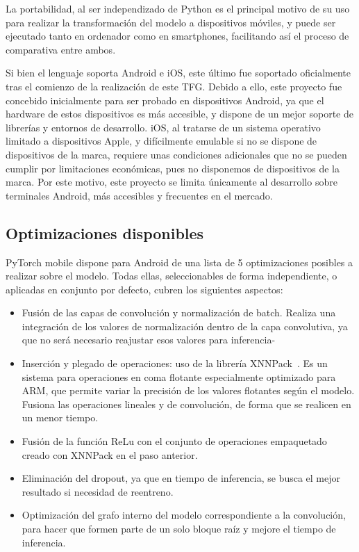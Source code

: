 La portabilidad, al ser independizado de Python es el principal motivo de su uso para realizar la transformación del modelo a dispositivos móviles, y puede ser ejecutado tanto en ordenador como en smartphones, facilitando así el proceso de comparativa entre ambos.

Si bien el lenguaje soporta Android e iOS,  este último fue soportado oficialmente tras el comienzo de la realización de este TFG. Debido a ello, este proyecto fue concebido inicialmente para ser probado en dispositivos Android, ya que el hardware de estos dispositivos es más accesible, y dispone de un mejor soporte de librerías y entornos de desarrollo. iOS, al tratarse de un sistema operativo limitado a dispositivos Apple, y difícilmente emulable si no se dispone de dispositivos de la marca, requiere unas condiciones adicionales que no se pueden cumplir por limitaciones económicas, pues no disponemos de dispositivos de la marca. Por este motivo, este proyecto se limita únicamente al desarrollo sobre terminales Android, más accesibles y frecuentes en el mercado.

\subsection{Optimizaciones disponibles}

PyTorch mobile dispone para Android de una lista de 5 optimizaciones posibles a realizar sobre el modelo. Todas ellas, seleccionables de forma independiente, o aplicadas en conjunto por defecto, cubren los siguientes aspectos:

\begin{itemize}
	\item Fusión de las capas de convolución y normalización de batch. Realiza una integración de los valores de normalización dentro de la capa convolutiva, ya que no será necesario reajustar esos valores para inferencia-
	\item Inserción y plegado de operaciones: uso de la librería XNNPack~\cite{xnnpack}. Es un sistema para operaciones en coma flotante especialmente optimizado para ARM, que permite variar la precisión de los valores flotantes según el modelo. Fusiona las operaciones lineales y de convolución, de forma que se realicen en un menor tiempo.
	\item Fusión de la función ReLu con el conjunto de operaciones empaquetado creado con XNNPack en el paso anterior.
	\item Eliminación del dropout, ya que en tiempo de inferencia, se busca el mejor resultado si necesidad de reentreno.
	\item Optimización del grafo interno del modelo correspondiente a la convolución, para hacer que formen parte de un solo bloque raíz y mejore el tiempo de inferencia.	
\end{itemize}

